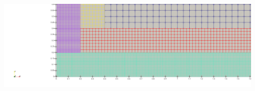 \documentclass[../main/main.tex]{subfiles}
\begin{document}
\begin{frame}{}
\begin{center}
\begin{minipage}{0.75\textwidth}
			\includegraphics[height=0.3\textheight]{imgs/ref3_PorPartes_border.png}
		\end{minipage}
	\end{center}
\end{frame}
\end{document}
